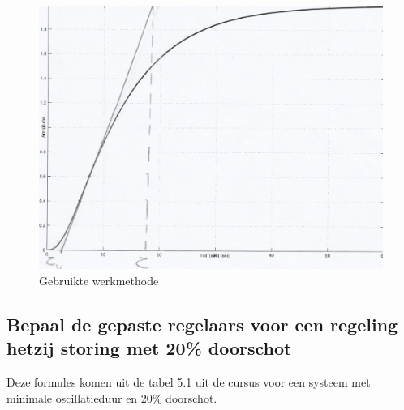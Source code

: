 \documentclass[a4paper, 12pt]{article}
\begin{document}
\begin{figure}[!h]
	\includegraphics[width=1\linewidth]{Labo1_1.jpg}
	\caption{Gebruikte werkmethode}
\end{figure}	
	
\newpage

\subsection{Bepaal de gepaste regelaars voor een regeling hetzij storing met 20\% doorschot}

\begin{table}[!h]
\begin{large}
\centering
{}
\end{large}
\end{table}
Deze formules komen uit de tabel 5.1 uit de cursus voor een systeem met minimale oscillatieduur en 20\% doorschot.
\end{document}

